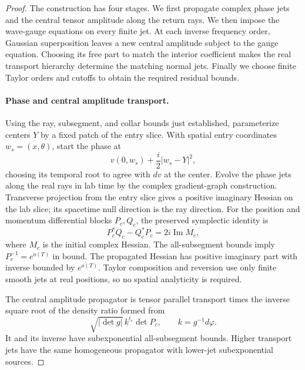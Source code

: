 \begin{proof}
The construction has four stages. We first propagate complex phase
jets and the central tensor amplitude along the return rays. We then
impose the wave-gauge equations on every finite jet. At each inverse
frequency order, Gaussian superposition leaves a new central amplitude
subject to the gauge equation. Choosing its free part to match the
interior coefficient makes the real transport hierarchy determine the
matching normal jets.
Finally we choose finite Taylor orders and cutoffs to obtain the
required residual bounds.

\paragraph{Phase and central amplitude transport.}
Using the ray, subsegment, and collar bounds just established,
parameterize centers $Y$
by a fixed patch of the entry slice. With spatial entry coordinates
$w_s=(x,\theta)$, start the phase at
\[
 v(0,w_s)+\frac{i}{2}|w_s-Y|^2,
\]
choosing its temporal root to agree with $dv$ at the center.
Evolve the phase jets along the real rays in lab time by the
complex gradient-graph construction. Transverse projection from
the entry slice gives a positive imaginary Hessian on the lab
slice; its spacetime null direction is the ray direction.
For the position and momentum differential blocks $P_c,Q_c$,
the preserved symplectic identity is
\[
 P_c^*Q_c-Q_c^*P_c=2i\operatorname{Im}M_c,
\]
where $M_c$ is the initial complex Hessian. The all-subsegment
bounds imply $P_c^{-1}=e^{o(T)}$ in bound. The propagated Hessian
has positive imaginary part with inverse bounded by $e^{o(T)}$.
Taylor composition and reversion use only finite smooth jets at
real positions, so no spatial analyticity is required.

The central amplitude propagator is tensor parallel transport
times the inverse square root of the density ratio formed from
\[
 \sqrt{|\det g|}\,k^{t_e}\det P_c,
 \qquad k=g^{-1}d\varphi.
\]
It and its inverse have subexponential all-subsegment bounds.
Higher transport jets have the same homogeneous propagator with
lower-jet subexponential sources.


\end{proof}

